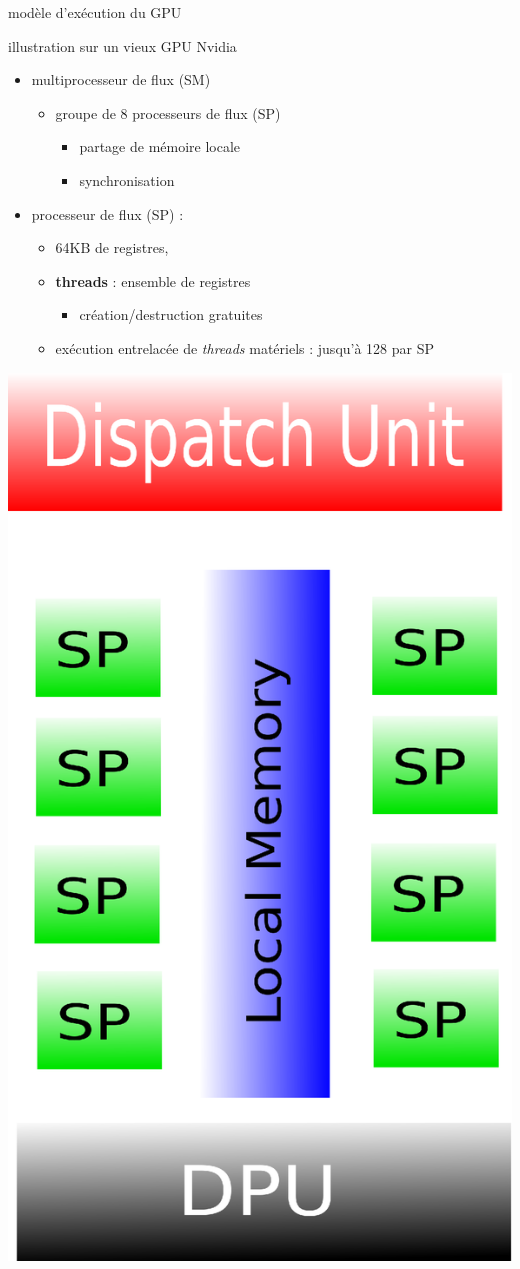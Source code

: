 \documentclass[11pt,mathserif]{beamer}
\begin{document}
\begin{frame}{modèle d'exécution du GPU}
  \begin{flushright}
    illustration sur un vieux GPU Nvidia
  \end{flushright}
\begin{minipage}[c]{0.49\linewidth}
\begin{itemize}
  \item multiprocesseur de flux (SM)
    \begin{itemize}
      \item groupe de 8 processeurs de flux (SP)
        \begin{itemize}
          \item partage de mémoire locale
          \item synchronisation
        \end{itemize}
    \end{itemize}
  \item processeur de flux (SP) : 
    \begin{itemize}
    \item 64KB de registres, 
    \item {\bf threads} : ensemble de registres
    \begin{itemize}
      \item création/destruction gratuites
    \end{itemize}
  \item exécution entrelacée de {\em threads} matériels : jusqu'à 128 par SP
    \end{itemize}
\end{itemize}
\end{minipage}
\begin{minipage}[c]{0.49\linewidth}
\begin{center}
  \includegraphics[width=0.6\linewidth]{fig/GPU_archi.eps}
\end{center}
\end{minipage}
\end{frame}
\end{document}
